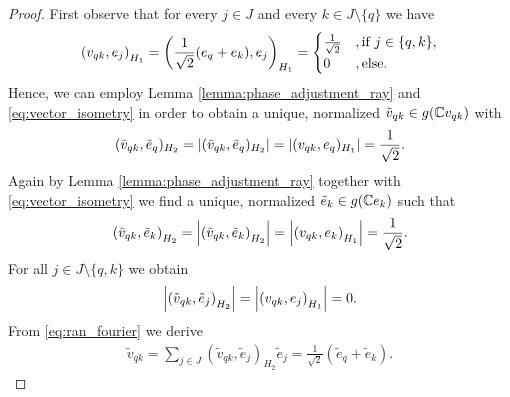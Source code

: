 \begin{proof}
	First observe that for every $j \in J$ and every $k \in J \setminus \{q\}$ we have
	\begin{align*}
		{\left ( v_{qk}, e_j \right )}_{H_1} = {\left ( \frac{1}{\sqrt{2}}(e_q + e_k), e_j \right )}_{H_1} =
		\begin{cases}
			\frac{1}{\sqrt{2}} &, \text{if } j \in \{q,k\}, \\
			0 &, \text{else}.
		\end{cases}
	\end{align*}
	Hence, we can employ Lemma \ref{lemma:phase_adjustment_ray} and \eqref{eq:vector_isometry} in order to obtain a unique, normalized $\tilde{v}_{qk} \in g(\mathbb{C} v_{qk})$ with
	\begin{align*}
		(\tilde{v}_{qk}, \tilde{e}_q)_{H_2} = {\left | (\tilde{v}_{qk}, \tilde{e}_q)_{H_2} \right |} = {\left | (v_{qk}, e_q)_{H_1} \right |} = \frac{1}{\sqrt{2}}.
	\end{align*}
	Again by Lemma \ref{lemma:phase_adjustment_ray} together with \eqref{eq:vector_isometry} we find a unique, normalized $\tilde{e}_{k} \in g(\mathbb{C} e_k)$ such that
	\begin{align*}
		{\left ( \tilde{v}_{qk}, \tilde{e}_k \right )}_{H_2} = {\left | {\left ( \tilde{v}_{qk}, \tilde{e}_k \right )}_{H_2} \right |} = {\left | {\left ( v_{qk}, e_k \right )}_{H_1} \right |} = \frac{1}{\sqrt{2}}.
	\end{align*}
	For all $j \in J \setminus \{q, k\}$ we obtain
	\begin{align*}
		{\left | {\left ( \tilde{v}_{qk}, \tilde{e}_j \right )}_{H_2} \right |} = {\left | {\left ( v_{qk}, e_j \right )}_{H_1} \right |} = 0.
	\end{align*}
	From \eqref{eq:ran_fourier} we derive
	\begin{align*}
		\tilde{v}_{qk} = \sum_{j \in J} (\tilde{v}_{qk}, \tilde{e}_j)_{H_2} \tilde{e}_j = \frac{1}{\sqrt{2}} (\tilde{e}_q + \tilde{e}_k).
	\end{align*}
	

\end{proof}
